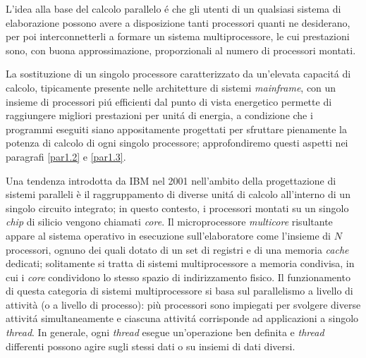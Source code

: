 L'idea alla base del calcolo parallelo \'e che gli utenti di un qualsiasi sistema di elaborazione possono avere a disposizione tanti processori
quanti ne desiderano, per poi interconnetterli a formare un sistema
multiprocessore, le cui prestazioni sono, con buona approssimazione,
proporzionali al numero di processori montati.

La sostituzione di un singolo processore caratterizzato da un'elevata
capacit\'a di calcolo, tipicamente presente nelle architetture di sistemi
\textit{mainframe}, con un insieme di processori pi\'u efficienti
dal punto di vista energetico permette di raggiungere migliori prestazioni
per unit\'a di energia, a condizione che i programmi eseguiti siano
appositamente progettati per sfruttare pienamente la potenza di calcolo di ogni
singolo processore; approfondiremo questi aspetti nei paragrafi \ref{par1.2} e \ref{par1.3}.

Una tendenza introdotta da IBM nel 2001 nell'ambito della progettazione di sistemi paralleli \cite{tendler2001power4} è il raggruppamento
di diverse unit\'a di calcolo all'interno di un singolo circuito integrato; in questo contesto, i processori montati su un singolo \textit{chip} di silicio vengono chiamati \textit{core}.
Il microprocessore \textit{multicore} risultante appare al sistema operativo in esecuzione sull'elaboratore come l'insieme di $N$ processori, ognuno dei quali dotato di un set di registri e di una memoria \textit{cache} dedicati; solitamente si tratta di sistemi multiprocessore a memoria condivisa, in cui i \textit{core} condividono lo stesso spazio di indirizzamento fisico.\newline
Il funzionamento di questa categoria di sistemi multiprocessore si basa sul parallelismo a livello di attività (o a livello di processo): più
processori sono impiegati per svolgere diverse attivit\'a simultaneamente e ciascuna attivit\'a corrisponde ad applicazioni a singolo
\textit{thread}. In generale, ogni \textit{thread} esegue un'operazione ben definita e \textit{thread} differenti possono agire sugli stessi
dati o su insiemi di dati diversi.

